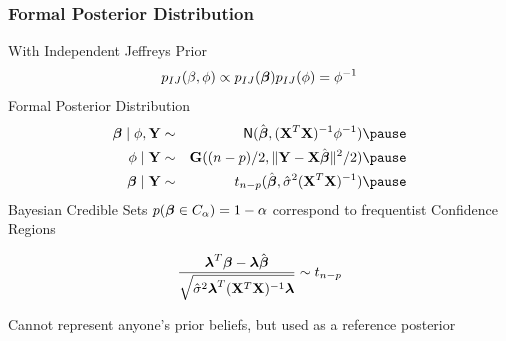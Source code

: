 \documentclass[handout]{beamer}\usepackage[]{graphicx}\usepackage[]{color}
\begin{document}
\begin{frame}
  \frametitle{Formal Posterior Distribution}
  With Independent Jeffreys Prior
$$p_{IJ}(\beta, \phi) \propto p_{IJ}(\boldsymbol{\beta}) p_{IJ}(\phi) =  \phi^{-1}$$
\pause
Formal Posterior Distribution
\pause
\begin{eqnarray*}
  \b \mid \phi, \Y & \sim & \N(\bhat, (\X^T\X)^{-1} \phi^{-1}) \pause \\
  \phi \mid \Y & \sim& \G((n-p)/2, \| \Y - \X\bhat \|^2/2) \pause\\
\b \mid \Y & \sim & t_{n-p}(\bhat, \shat (\X^T\X)^{-1})\pause
\end{eqnarray*}
Bayesian Credible Sets
$p(\boldsymbol{\beta} \in C_\alpha) = 1- \alpha$ correspond to frequentist Confidence
Regions

$$\frac{\boldsymbol{\lambda}^T\boldsymbol{\beta} - \boldsymbol{\lambda}\hat{\boldsymbol{\beta}}}
{\sqrt{{\hat{\sigma}}^2 \boldsymbol{\lambda}^T(\mathbf{X}^T\mathbf{X})^{-1} \boldsymbol{\lambda}}} \sim t_{n-p}$$ \pause

Cannot represent anyone's prior beliefs, but used as a reference posterior
\end{frame}
\end{document}

